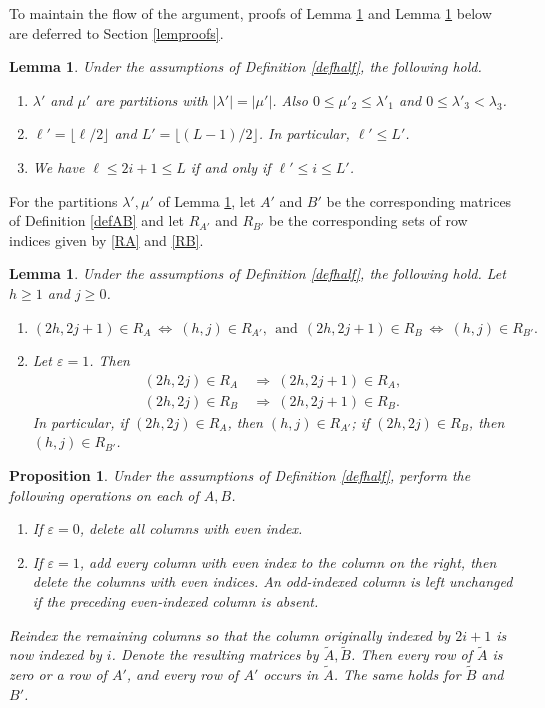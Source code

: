\documentclass[11pt]{amsart}
\newtheorem{lemma}[theorem]{Lemma}
\newtheorem{proposition}[theorem]{Proposition}
\theoremstyle{remark}
\theoremstyle{definition}
\newcommand{\la}{\lambda}
\numberwithin{equation}{section}
\begin{document}
	To maintain the flow of the argument, proofs of Lemma \ref{lemsmaller} and Lemma \ref{lemrowhalf} below are deferred to Section \ref{lemproofs}.
	\begin{lemma}\label{lemsmaller}Under the assumptions of Definition \ref{defhalf}, the following hold.
		\begin{enumerate}
			\item $\la'$ and $\mu'$ are partitions with $|\la'|=|\mu'|$. Also
			$0\le\mu'_2\le\la'_1$ and
			$0\le\la'_3<\la_3$.
			\item $\ell'=\lfloor\ell/2\rfloor$ and
			$L'=\lfloor(L-1)/2\rfloor$. In particular, $\ell'\le L'$.
			\item We have $\ell\le2i+1\le L$ if and only if $\ell'\le i\le L'$.
		\end{enumerate}
	\end{lemma}

For the partitions $\la',\mu'$ of Lemma \ref{lemsmaller}, let $A'$ and $B'$ be the corresponding matrices of Definition \ref{defAB} and let $R_{A'}$ and $R_{B'}$ be the corresponding sets of row indices given by \eqref{RA} and \eqref{RB}.


\begin{lemma}\label{lemrowhalf}
Under the assumptions of Definition \ref{defhalf}, the following hold. Let $h\ge1$ and $j \ge 0$.
\begin{enumerate}
\item
$
(2h,2j+1)\in R_A \ \Leftrightarrow\ (h,j)\in R_{A'}, \ \ \text{and} \ \
(2h,2j+1)\in R_B \ \Leftrightarrow\ (h,j)\in R_{B'}.
$
\item Let $\varepsilon=1$. Then
\[
\begin{aligned}
(2h,2j)\in R_A&\ \Rightarrow\ (2h,2j+1)\in R_A,\\
(2h,2j)\in R_B&\ \Rightarrow\ (2h,2j+1)\in R_B.
\end{aligned}
\]
In particular, if $(2h,2j)\in R_A$, then $(h,j)\in R_{A'}$; if
$(2h,2j)\in R_B$, then $(h,j)\in R_{B'}$.
\end{enumerate}
\end{lemma}


\begin{proposition}\label{matrixreduction}
	Under the assumptions of Definition \ref{defhalf}, perform the
	following operations on each of $A, B$.
	\begin{enumerate}
		\item If $\varepsilon=0$, delete all columns with even index.
		\item If $\varepsilon=1$, add every column with even index to the
		column on the right, then delete the columns with even indices.
		An odd-indexed column is left unchanged if the preceding
		even-indexed column is absent.
	\end{enumerate}
Reindex the remaining columns so that the column originally indexed by \(2i+1\) is now indexed by \(i\). Denote the resulting matrices by \(\widetilde A,\widetilde B\). Then every row of $\widetilde A$ is zero
	or a row of $A'$, and every row of $A'$ occurs in $\widetilde A$. The same holds
	for $\widetilde B$ and $B'$.
\end{proposition}
\end{document}
